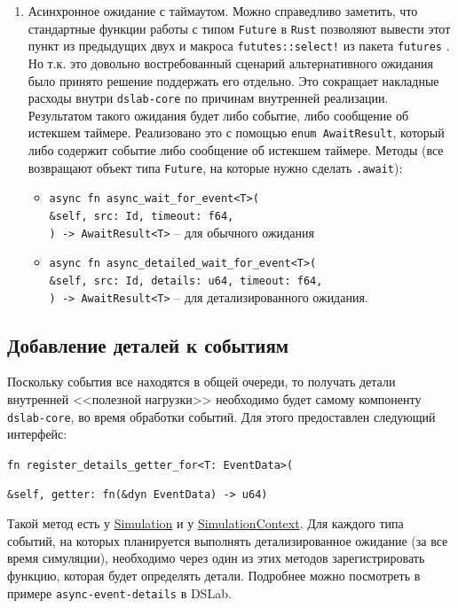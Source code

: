 \begin{enumerate}
\begin{itemize}
    \end{itemize}
    \item Асинхронное ожидание с таймаутом. Можно справедливо заметить, что стандартные функции работы с типом \texttt{Future} в \texttt{Rust} позволяют вывести этот пункт из предыдущих двух и макроса \texttt{fututes::select!} из пакета \texttt{futures} \cite{rust-futures}. Но т.к. это довольно востребованный сценарий альтернативного ожидания было принято решение поддержать его отдельно. Это сокращает накладные расходы внутри \texttt{dslab-core} по причинам внутренней реализации. Результатом такого ожидания будет либо событие, либо сообщение об истекшем таймере. Реализовано это с помощью \texttt{enum AwaitResult}, который либо содержит событие либо сообщение об истекшем таймере. Методы (все возвращают объект типа \texttt{Future}, на которые нужно сделать \texttt{.await}):
    \begin{itemize}
        \item \texttt{async fn async\_wait\_for\_event<T>(\\\&self, src: Id, timeout: f64,\\) -> AwaitResult<T>} -- для обычного ожидания
        \item \texttt{async fn async\_detailed\_wait\_for\_event<T>(\\\&self, src: Id, details: u64, timeout: f64,\\) -> AwaitResult<T>} -- для детализированного ожидания. 
    \end{itemize}
\end{enumerate}

\subsection{Добавление деталей к событиям}\label{add-details-getters}

Поскольку события все находятся в общей очереди, то получать детали внутренней <<полезной нагрузки>> необходимо будет самому компоненту \texttt{dslab-core}, во время обработки событий. Для этого предоставлен следующий интерфейс:
\begin{flushleft}
     \texttt{fn register\_details\_getter\_for<T: EventData>(}
\end{flushleft}
\vspace{-1.2cm}
\begin{flushright}
      \texttt{\&self, getter: fn(\&dyn EventData) -> u64)}
\end{flushright}

Такой метод есть у \hyperref[Simulation]{Simulation} и у \hyperref[SimulationContext]{SimulationContext}. Для каждого типа событий, на которых планируется выполнять детализированное ожидание (за все время симуляции), необходимо через один из этих методов зарегистрировать функцию, которая будет определять детали. Подробнее можно посмотреть в примере \texttt{async-event-details} в DSLab\cite{async-event-details-example}.

